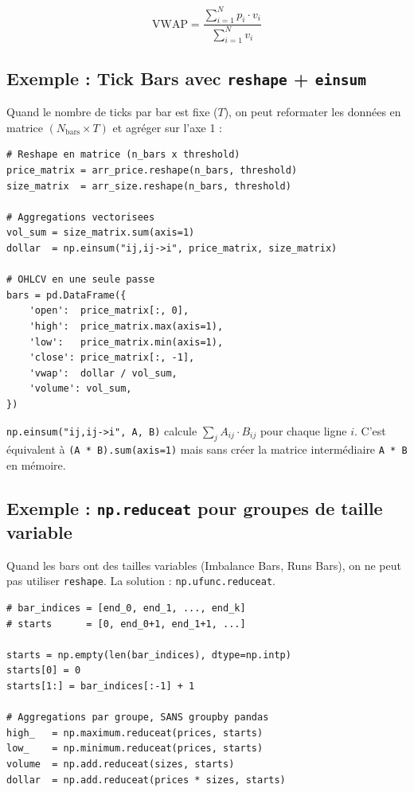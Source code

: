 \documentclass[11pt, a4paper]{article}
\begin{document}
\begin{equation}
    \text{VWAP} = \frac{\sum_{i=1}^{N} p_i \cdot v_i}{\sum_{i=1}^{N} v_i}
\end{equation}

\subsection{Exemple : Tick Bars avec \texttt{reshape} + \texttt{einsum}}

Quand le nombre de ticks par bar est fixe ($T$), on peut reformater
les donn\'ees en matrice $(N_{\text{bars}} \times T)$ et agr\'eger sur l'axe 1 :

\begin{lstlisting}
# Reshape en matrice (n_bars x threshold)
price_matrix = arr_price.reshape(n_bars, threshold)
size_matrix  = arr_size.reshape(n_bars, threshold)

# Aggregations vectorisees
vol_sum = size_matrix.sum(axis=1)
dollar  = np.einsum("ij,ij->i", price_matrix, size_matrix)

# OHLCV en une seule passe
bars = pd.DataFrame({
    'open':  price_matrix[:, 0],
    'high':  price_matrix.max(axis=1),
    'low':   price_matrix.min(axis=1),
    'close': price_matrix[:, -1],
    'vwap':  dollar / vol_sum,
    'volume': vol_sum,
})
\end{lstlisting}

\begin{keybox}
\texttt{np.einsum("ij,ij->i", A, B)} calcule $\sum_j A_{ij} \cdot B_{ij}$
pour chaque ligne $i$. C'est \'equivalent \`a \texttt{(A * B).sum(axis=1)} mais
sans cr\'eer la matrice interm\'ediaire \texttt{A * B} en m\'emoire.
\end{keybox}


\subsection{Exemple : \texttt{np.reduceat} pour groupes de taille variable}

Quand les bars ont des tailles variables (Imbalance Bars, Runs Bars),
on ne peut pas utiliser \texttt{reshape}. La solution :
\texttt{np.ufunc.reduceat}.

\begin{lstlisting}
# bar_indices = [end_0, end_1, ..., end_k]
# starts      = [0, end_0+1, end_1+1, ...]

starts = np.empty(len(bar_indices), dtype=np.intp)
starts[0] = 0
starts[1:] = bar_indices[:-1] + 1

# Aggregations par groupe, SANS groupby pandas
high_   = np.maximum.reduceat(prices, starts)
low_    = np.minimum.reduceat(prices, starts)
volume  = np.add.reduceat(sizes, starts)
dollar  = np.add.reduceat(prices * sizes, starts)
\end{lstlisting}
\end{document}
